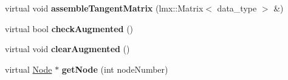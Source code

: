 \begin{CompactItemize}
\item 
\hypertarget{classmknix_1_1Constraint_c376643d6d73cb3b591ba80aae9f7166}{
virtual void \textbf{assembleTangentMatrix} (lmx::Matrix$<$ data\_\-type $>$ \&)}
\label{classmknix_1_1Constraint_c376643d6d73cb3b591ba80aae9f7166}

\item 
\hypertarget{classmknix_1_1Constraint_26923b449734b9f11ed5ca2556585dcb}{
virtual bool \textbf{checkAugmented} ()}
\label{classmknix_1_1Constraint_26923b449734b9f11ed5ca2556585dcb}

\item 
\hypertarget{classmknix_1_1Constraint_2e1f0de7e983151fb892468774dcdf12}{
virtual void \textbf{clearAugmented} ()}
\label{classmknix_1_1Constraint_2e1f0de7e983151fb892468774dcdf12}

\item 
\hypertarget{classmknix_1_1Constraint_0e81d924dad26b7b5b0749d4580dd63c}{
virtual \hyperlink{classmknix_1_1Node}{Node} $\ast$ \textbf{getNode} (int nodeNumber)}
\label{classmknix_1_1Constraint_0e81d924dad26b7b5b0749d4580dd63c}

\end{CompactItemize}
